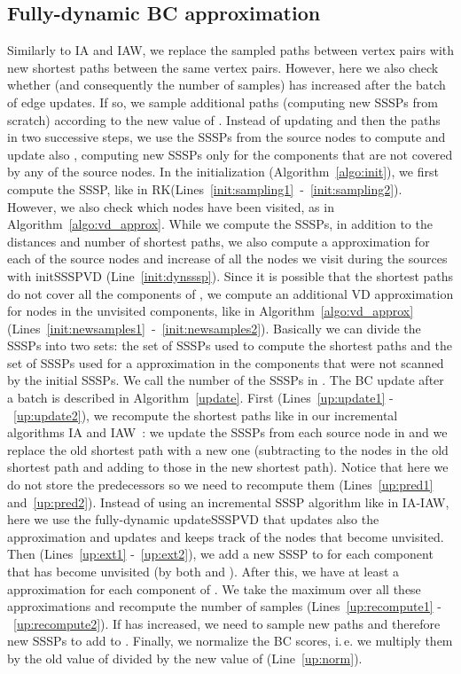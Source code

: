 \documentclass[english]{llncs}
\newcommand{\ie}{i.\,e.\xspace}
\newcommand{\vd}{\xspace}
\newcommand{\rk}{\textsf{RK}\xspace}
\begin{document}
\subsection{Fully-dynamic BC approximation} 
\label{sec:fully_dyn_bc}
Similarly to \textsf{IA} and \textsf{IAW}, we replace the  sampled paths between vertex pairs  with new shortest paths between the same vertex pairs. However, here we also check whether  (and consequently the number  of samples) has increased after the batch of edge updates. If so, we sample additional paths (computing new SSSPs from scratch) according to the new value of . Instead of updating  and then the paths in two successive steps, we use the SSSPs from the  source nodes  to compute and update also , computing new SSSPs only for the components that are not covered by any of the source nodes. In the initialization (Algorithm~\ref{algo:init}), we first compute the  SSSP, like in \rk (Lines~\ref{init:sampling1}~-~\ref{init:sampling2}). However, we also check which nodes have been visited, as in Algorithm~\ref{algo:vd_approx}. While we compute the  SSSPs, in addition to the distances and number of shortest paths, we also compute a \vd approximation for each of the  source nodes and increase  of all the nodes we visit during the sources with \textsf{initSSSPVD} (Line~\ref{init:dynsssp}). Since it is possible that the  shortest paths do not cover all the components of , we compute an additional VD approximation for nodes in the unvisited components, like in Algorithm~\ref{algo:vd_approx} (Lines~\ref{init:newsamples1}~-~\ref{init:newsamples2}). Basically we can divide the SSSPs into two sets: the set  of SSSPs used to compute the  shortest paths and the set  of SSSPs used for a \vd approximation in the components that were not scanned by the initial  SSSPs. We call  the number of the SSSPs in . The BC update after a batch is described in Algorithm~\ref{update}. First (Lines~\ref{up:update1} -~\ref{up:update2}), we recompute the shortest paths like in our incremental algorithms \textsf{IA} and \textsf{IAW}~\cite{DBLP:conf/alenex/BergaminiMS15}: we update the SSSPs from each source node  in  and we replace the old shortest path with a new one (subtracting  to the nodes in the old shortest path and adding  to those in the new shortest path). Notice that here we do not store the predecessors so we need to recompute them (Lines~\ref{up:pred1} and~\ref{up:pred2}).
Instead of using an incremental SSSP algorithm like in \textsf{IA}-\textsf{IAW}, here we use the fully-dynamic \textsf{updateSSSPVD} that updates also the \vd approximation and updates and keeps track of the nodes that become unvisited.
Then (Lines~\ref{up:ext1} -~\ref{up:ext2}), we add a new SSSP to  for each component that has become unvisited (by both  and ). After this, we have at least a \vd approximation for each component of . We take the maximum over all these approximations and recompute the number of samples  (Lines~\ref{up:recompute1} -~\ref{up:recompute2}). If  has increased, we need to sample new paths and therefore new SSSPs to add to . Finally, we normalize the BC scores, \ie we multiply them by the old value of  divided by the new value of  (Line~\ref{up:norm}).
\end{document}
